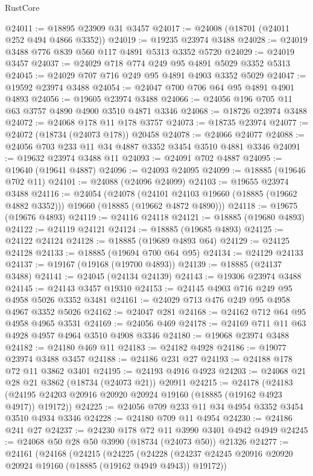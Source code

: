 \begin{lexlean}{RustCore}
\begin{coremodule}
@24011 := @18895 @23909 @31 @3457
@24017 := @24008 (@18701 (@24011 @252 @494 @4866 @3352))
@24019 := @19235 @23974 @3488
@24028 := @24019 @3488 @776 @839 @560 @117 @4891 @5313 @3352 @5720
@24029 := @24019 @3457
@24037 := @24029 @718 @774 @249 @95 @4891 @5029 @3352 @5313
@24045 := @24029 @707 @716 @249 @95 @4891 @4903 @3352 @5029
@24047 := @19592 @23974 @3488
@24054 := @24047 @700 @706 @64 @95 @4891 @4901 @4893
@24056 := @19605 @23974 @3488
@24066 := @24056 @196 @705 @11 @63 @3757 @4890 @4900 @3510 @4871 @3346
@24068 := @18726 @23974 @3488
@24072 := @24068 @178 @11 @178 @3757
@24073 := @18735 @23974
@24077 := @24072 (@18734 (@24073 @178)) @20458
@24078 := @24066 @24077
@24088 := @24056 @703 @233 @11 @34 @4887 @3352 @3454 @3510 @4881 @3346
@24091 := @19632 @23974 @3488 @11
@24093 := @24091 @702 @4887
@24095 := @19640 (@19641 @4887)
@24096 := @24093 @24095
@24099 := @18885 (@19646 @702 @11)
@24101 := @24088 (@24096 @24099)
@24103 := @19655 @23974 @3488
@24116 := @24054
    (@24078
      (@24101 @24103 @19660 (@18885 (@19662 @4882 @3352)))
      @19660
      (@18885 (@19662 @4872 @4890)))
@24118 := @19675 (@19676 @4893)
@24119 := @24116 @24118
@24121 := @18885 (@19680 @4893)
@24122 := @24119 @24121
@24124 := @18885 (@19685 @4893)
@24125 := @24122 @24124
@24128 := @18885 (@19689 @4893 @64)
@24129 := @24125 @24128
@24133 := @18885 (@19694 @700 @64 @95)
@24134 := @24129 @24133
@24137 := @19167 (@19168 (@19700 @4893))
@24139 := @18885 (@24137 @3488)
@24141 := @24045 (@24134 @24139)
@24143 := @19306 @23974 @3488
@24145 := @24143 @3457 @19310
@24153 := @24145 @4903 @716 @249 @95 @4958 @5026 @3352 @3481
@24161 := @24029 @713 @476 @249 @95 @4958 @4967 @3352 @5026
@24162 := @24047 @281
@24168 := @24162 @712 @64 @95 @4958 @4965 @3531
@24169 := @24056 @469
@24178 := @24169 @711 @11 @63 @4928 @4957 @4964 @3510 @4908 @3346
@24180 := @19068 @23974 @3488
@24182 := @24180 @469 @11
@24183 := @24182 @4928
@24186 := @19077 @23974 @3488 @3457
@24188 := @24186 @231 @27
@24193 := @24188 @178 @72 @11 @3862 @3401
@24195 := @24193 @4916 @4923
@24203 := @24068 @21 @28 @21 @3862 (@18734 (@24073 @21)) @20911
@24215 := @24178
    (@24183 (@24195 @24203 @20916 @20920 @20924 @19160 (@18885 (@19162 @4923 @4917)) @19172))
@24225 := @24056 @709 @233 @11 @34 @4954 @3352 @3454 @3510 @4934 @3346
@24228 := @24180 @709 @11 @4954
@24230 := @24186 @241 @27
@24237 := @24230 @178 @72 @11 @3990 @3401 @4942 @4949
@24245 := @24068 @50 @28 @50 @3990 (@18734 (@24073 @50)) @21326
@24277 := @24161
    (@24168
      (@24215
        (@24225
          (@24228 (@24237 @24245 @20916 @20920 @20924 @19160 (@18885 (@19162 @4949 @4943)) @19172))

\end{coremodule}
\end{lexlean}
